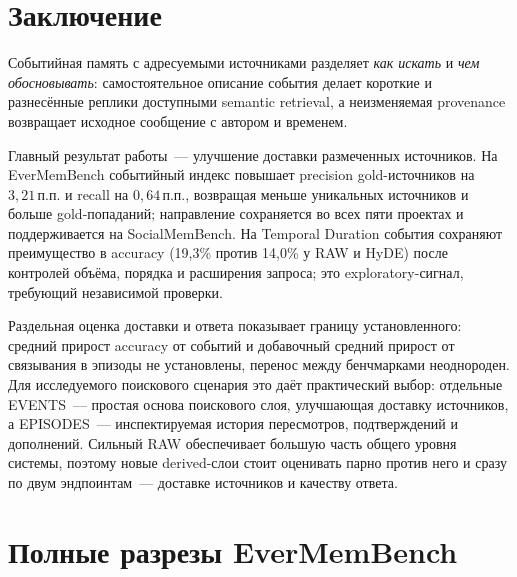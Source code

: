 \documentclass[11pt,a4paper]{article}
\newcommand{\raw}{RAW}
\newcommand{\events}{EVENTS}
\newcommand{\episodes}{EPISODES}
\newcommand{\pp}{\,\text{п.п.}}
\begin{document}
\section{Заключение}

Событийная память с адресуемыми источниками разделяет \emph{как искать} и
\emph{чем обосновывать}: самостоятельное описание события делает короткие и
разнесённые реплики доступными semantic retrieval, а неизменяемая provenance
возвращает исходное сообщение с автором и временем.

Главный результат работы~--- улучшение доставки размеченных источников. На
EverMemBench событийный индекс повышает precision gold-источников на
$3{,}21\pp$ и recall на $0{,}64\pp$, возвращая меньше уникальных источников и
больше gold-попаданий; направление сохраняется во всех пяти проектах и
поддерживается на SocialMemBench. На Temporal Duration события сохраняют
преимущество в accuracy (19{,}3\% против 14{,}0\% у RAW и HyDE) после контролей
объёма, порядка и расширения запроса; это exploratory-сигнал, требующий
независимой проверки.

Раздельная оценка доставки и ответа показывает границу установленного: средний
прирост accuracy от событий и добавочный средний прирост от связывания в эпизоды
не установлены, перенос между бенчмарками неоднороден. Для исследуемого
поискового сценария это даёт практический выбор: отдельные \events{}~--- простая
основа поискового слоя, улучшающая доставку источников, а \episodes{}~---
инспектируемая история пересмотров, подтверждений и дополнений. Сильный \raw{}
обеспечивает большую часть общего уровня системы, поэтому новые derived-слои
стоит оценивать парно против него и сразу по двум эндпоинтам~--- доставке
источников и качеству ответа.

\FloatBarrier
\begingroup
\small


\endgroup
\clearpage
\appendix

\section{Полные разрезы EverMemBench}
\end{document}

